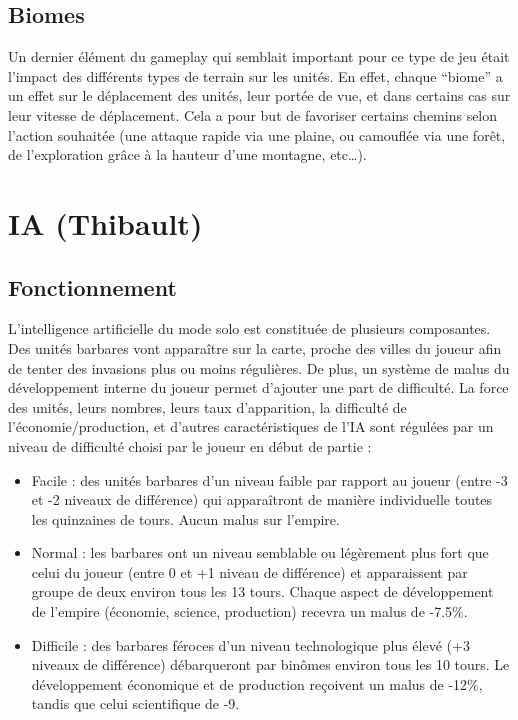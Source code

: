 \documentclass[12pt]{report}
\begin{document}
\subsection{Biomes}

Un dernier élément du gameplay qui semblait important pour ce type de jeu était
l’impact des différents types de terrain sur les unités. En effet, chaque
“biome” a un effet sur le déplacement des unités, leur portée de vue, et dans
certains cas sur leur vitesse de déplacement. Cela a pour but de favoriser
certains chemins selon l’action souhaitée (une attaque rapide via une plaine, ou
camouflée via une forêt, de l'exploration grâce à la hauteur d’une montagne,
etc…).

\section{IA (Thibault)}

\subsection{Fonctionnement}

L’intelligence artificielle du mode solo est constituée de plusieurs
composantes. Des unités barbares vont apparaître sur la carte, proche des villes
du joueur afin de tenter des invasions plus ou moins régulières. De plus, un
système de malus du développement interne du joueur permet d’ajouter une part de
difficulté. La force des unités, leurs nombres, leurs taux d’apparition, la
difficulté de l’économie/production, et d’autres caractéristiques de l’IA sont
régulées par un niveau de difficulté choisi par le joueur en début de partie :

\begin{itemize}
    \item Facile : des unités barbares d'un niveau faible par rapport au joueur
        (entre -3 et -2 niveaux de différence) qui apparaîtront de manière
        individuelle toutes les quinzaines de tours. Aucun malus sur l'empire.
    \item Normal : les barbares ont un niveau semblable ou légèrement plus fort
        que celui du joueur (entre 0 et +1 niveau de différence) et apparaissent
        par groupe de deux environ tous les 13 tours. Chaque aspect de
        développement de l'empire (économie, science, production) recevra un
        malus de -7.5\%.
    \item Difficile : des barbares féroces d'un niveau technologique plus élevé
        (+3 niveaux de différence) débarqueront par binômes environ tous les 10
        tours. Le développement économique et de production reçoivent un malus
        de -12\%, tandis que celui scientifique de -9.
\end{itemize}
\end{document}
